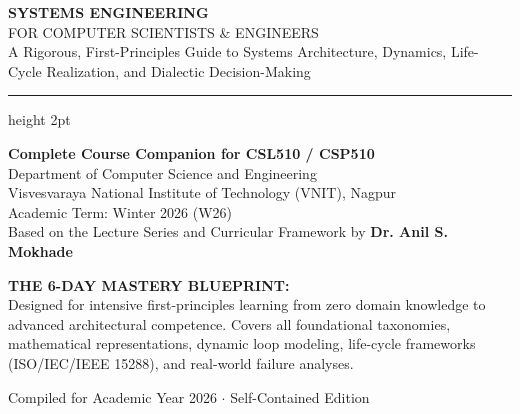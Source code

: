 
\begin{titlepage}
\pagecolor{sePrimary}
\color{white}
\noindent
\vspace{2cm}

{\Huge \sffamily \bfseries SYSTEMS ENGINEERING}\\[0.5em]
{\LARGE \sffamily FOR COMPUTER SCIENTISTS \& ENGINEERS}\\[1.5em]
{\large \sffamily A Rigorous, First-Principles Guide to Systems Architecture, Dynamics, Life-Cycle Realization, and Dialectic Decision-Making}

\vspace{1.5cm}
\color{seSecondary!40}
\hrule height 2pt
\vspace{1.5cm}

\color{white}
\textbf{\large Complete Course Companion for CSL510 / CSP510}\\[0.4em]
{\normalsize Department of Computer Science and Engineering}\\
{\normalsize Visvesvaraya National Institute of Technology (VNIT), Nagpur}\\
{\normalsize Academic Term: Winter 2026 (W26)}\\[0.4em]
{\small Based on the Lecture Series and Curricular Framework by \textbf{Dr. Anil S. Mokhade}}

\vfill

\begin{tcolorbox}[
    colback=white,
    colframe=white,
    arc=4pt,
    width=\textwidth,
    coltext=seDarkText
]
\sffamily
\textbf{\color{sePrimary}THE 6-DAY MASTERY BLUEPRINT:}\\
Designed for intensive first-principles learning from zero domain knowledge to advanced architectural competence. Covers all foundational taxonomies, mathematical representations, dynamic loop modeling, life-cycle frameworks (ISO/IEC/IEEE 15288), and real-world failure analyses.
\end{tcolorbox}

\vspace{1cm}
{\small Compiled for Academic Year 2026 $\cdot$ Self-Contained Edition}
\end{titlepage}
\nopagecolor

